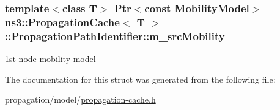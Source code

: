 \subsubsection[{\texorpdfstring{m\+\_\+src\+Mobility}{m_srcMobility}}]{\setlength{\rightskip}{0pt plus 5cm}template$<$class T$>$ {\bf Ptr}$<$const {\bf Mobility\+Model}$>$ {\bf ns3\+::\+Propagation\+Cache}$<$ T $>$\+::Propagation\+Path\+Identifier\+::m\+\_\+src\+Mobility}\hypertarget{structns3_1_1PropagationCache_1_1PropagationPathIdentifier_a89a398a7cce2c9a9b7bb4bc0ddc45710}{}\label{structns3_1_1PropagationCache_1_1PropagationPathIdentifier_a89a398a7cce2c9a9b7bb4bc0ddc45710}


1st node mobility model 



The documentation for this struct was generated from the following file\+:\begin{DoxyCompactItemize}
\item 
propagation/model/\hyperlink{propagation-cache_8h}{propagation-\/cache.\+h}\end{DoxyCompactItemize}
